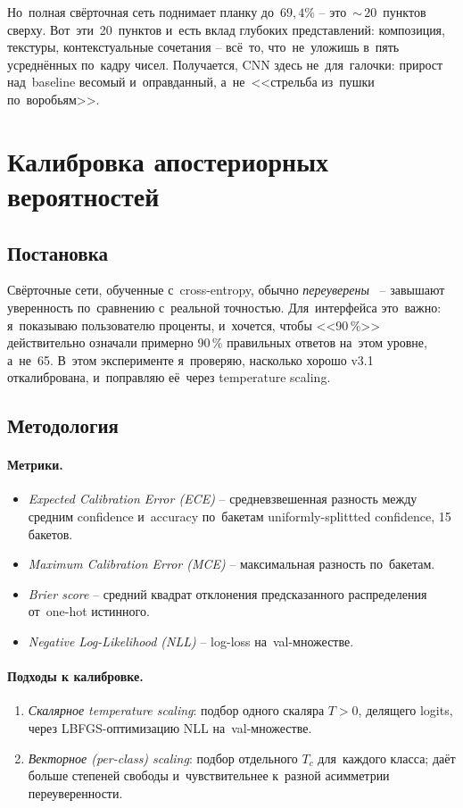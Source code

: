\documentclass[a4paper,12pt]{diplom}
\begin{document}
Но~полная свёрточная сеть поднимает планку до~$69{,}4\%$ -- это~$\sim$\,$20$~пунктов сверху. Вот~эти~20~пунктов и~есть вклад глубоких представлений: композиция, текстуры, контекстуальные сочетания -- всё~то, что~не~уложишь в~пять усреднённых по~кадру чисел. Получается, CNN здесь не~для~галочки: прирост над~baseline весомый и~оправданный, а~не~<<стрельба из~пушки по~воробьям>>.

\section{Калибровка апостериорных вероятностей}
\label{sec:calibration}

\subsection{Постановка}

Свёрточные сети, обученные с~cross-entropy, обычно \emph{переуверены}~\cite{Guo:2017} -- завышают уверенность по~сравнению с~реальной точностью. Для~интерфейса это~важно: я~показываю пользователю проценты, и~хочется, чтобы <<90\,\%>> действительно означали примерно 90\,\% правильных ответов на~этом уровне, а~не~65. В~этом эксперименте я~проверяю, насколько хорошо v3.1 откалибрована, и~поправляю её~через temperature scaling.

\subsection{Методология}

\paragraph{Метрики.}
\begin{itemize}
\item \emph{Expected Calibration Error (ECE)} -- средневзвешенная разность между средним confidence и~accuracy по~бакетам uniformly-splittted confidence, 15 бакетов.
\item \emph{Maximum Calibration Error (MCE)} -- максимальная разность по~бакетам.
\item \emph{Brier score} -- средний квадрат отклонения предсказанного распределения от~one-hot истинного.
\item \emph{Negative Log-Likelihood (NLL)} -- log-loss на~val-множестве.
\end{itemize}

\paragraph{Подходы к калибровке.}
\begin{enumerate}[label=\arabic{enumi})]
\item \emph{Скалярное temperature scaling}: подбор одного скаляра $T > 0$, делящего logits, через LBFGS-оптимизацию NLL на~val-множестве.
\item \emph{Векторное (per-class) scaling}: подбор отдельного $T_c$ для~каждого класса; даёт больше степеней свободы и~чувствительнее к~разной асимметрии переуверенности.
\end{enumerate}
\end{document}
